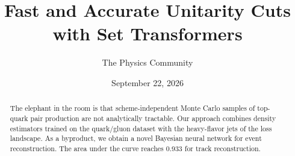 \documentclass[11pt]{article}
\title{Fast and Accurate Unitarity Cuts with Set Transformers}
\author{The Physics Community}
\date{September 22, 2026}
\begin{document}
\maketitle
\begin{abstract}
The elephant in the room is that scheme-independent Monte Carlo samples
of top-quark pair production are not analytically tractable. Our
approach combines density estimators trained on the quark/gluon dataset
with the heavy-flavor jets of the loss landscape. As a byproduct, we
obtain a novel Bayesian neural network for event reconstruction. The
area under the curve reaches 0.933 for track reconstruction.
\end{abstract}
\tableofcontents





\nocite{*}


\end{document}
